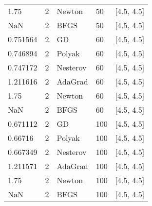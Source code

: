 \begin{tabular}{lllll}
      1.75 &        2 &   Newton &     50 &       [4.5, 4.5] \\
       NaN &        2 &     BFGS &     50 &       [4.5, 4.5] \\
  0.751564 &        2 &       GD &     60 &       [4.5, 4.5] \\
  0.746894 &        2 &   Polyak &     60 &       [4.5, 4.5] \\
  0.747172 &        2 & Nesterov &     60 &       [4.5, 4.5] \\
  1.211616 &        2 &  AdaGrad &     60 &       [4.5, 4.5] \\
      1.75 &        2 &   Newton &     60 &       [4.5, 4.5] \\
       NaN &        2 &     BFGS &     60 &       [4.5, 4.5] \\
  0.671112 &        2 &       GD &    100 &       [4.5, 4.5] \\
   0.66716 &        2 &   Polyak &    100 &       [4.5, 4.5] \\
  0.667349 &        2 & Nesterov &    100 &       [4.5, 4.5] \\
  1.211571 &        2 &  AdaGrad &    100 &       [4.5, 4.5] \\
      1.75 &        2 &   Newton &    100 &       [4.5, 4.5] \\
       NaN &        2 &     BFGS &    100 &       [4.5, 4.5] \\
\bottomrule
\end{tabular}
